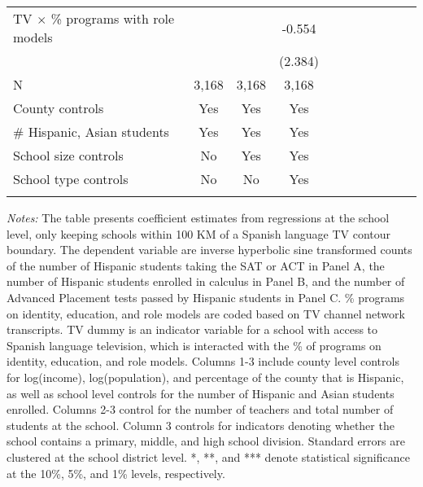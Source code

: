 \begin{table}[!htbp]
{\begin{threeparttable}
\begin{tabular}{lcccccccccc}
				 TV $\times$  \% programs with role models &  &  & -0.554 \\ 
				  &  &  & (2.384) \\ 
				  \addlinespace\hline
				N & 3,168 & 3,168 & 3,168 \\ 
				\hline\hline\addlinespace
				County controls & Yes & Yes  & Yes\\
				\# Hispanic, Asian students & Yes & Yes  & Yes\\
                                	School size controls & No & Yes & Yes\\
                                	School type controls & No & No & Yes \\
					\addlinespace\hline\hline
			\end{tabular}
			\begin{tablenotes}[flushleft]
				\item \textit{Notes:} The table presents coefficient estimates from regressions at the school level, only keeping schools within 100 KM of a Spanish language TV contour boundary. The dependent variable are inverse hyperbolic sine transformed counts of the number of Hispanic students taking the SAT or ACT in Panel A, the number of Hispanic students enrolled in calculus in Panel B, and the number of Advanced Placement tests passed by Hispanic students in Panel C. \% programs on identity, education, and role models are coded based on TV channel network transcripts. TV dummy is an indicator variable for a school with access to Spanish language television, which is interacted with the \% of programs on identity, education, and role models. Columns 1-3 include county level controls for log(income), log(population), and percentage of the county that is Hispanic, as well as school level controls for the number of Hispanic and Asian students enrolled. Columns 2-3 control for the number of teachers and total number of students at the school. Column 3 controls for indicators denoting whether the school contains a primary, middle, and high school division. Standard errors are clustered at the school district level. *, **, and *** denote statistical significance at the 10\%, 5\%, and 1\% levels, respectively.			\end{tablenotes}
		\end{threeparttable}
	}
\end{table}